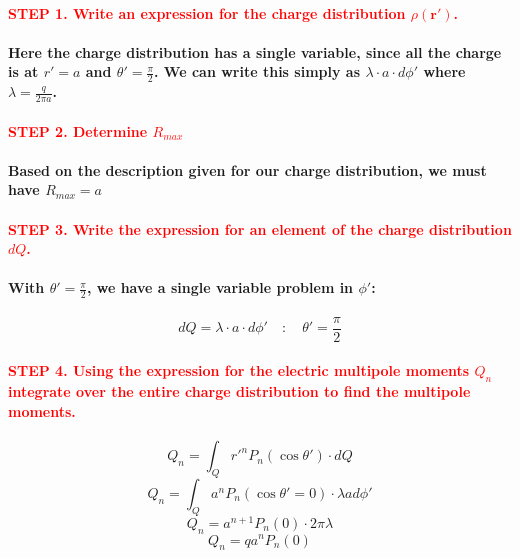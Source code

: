 \documentclass{article}
\begin{document}
\paragraph{\textcolor{red}{STEP 1. Write an expression for the charge distribution $\rho(\boldsymbol{r}')$.}}
\paragraph{\indent Here the charge distribution has a single variable, since all the charge is at $r'=a$ and $\theta'=\frac{\pi}{2}$. We can write this simply as $\lambda\cdot a\cdot d\phi'$ where $\lambda=\frac{q}{2\pi a}$.}
\paragraph{\textcolor{red}{STEP 2. Determine $R_{max}$}}
\paragraph{\indent Based on the description given for our charge distribution, we must have $R_{max}=a$}
\paragraph{\textcolor{red}{STEP 3. Write the expression for an element of the charge distribution $dQ$.}}
\paragraph{\indent With $\theta'=\frac{\pi}{2}$, we have a single variable problem in $\phi'$:}
\begin{equation*}
    dQ=\lambda\cdot a \cdot d\phi' \quad:\quad \theta'=\frac{\pi}{2}
\end{equation*}
\paragraph{\textcolor{red}{STEP 4. Using the expression for the electric multipole moments $Q_n$ integrate over the entire charge distribution to find the multipole moments.}}
\begin{equation*}
    Q_n=\int_Q r'^n P_n(\cos\theta')\cdot dQ
\end{equation*}
\begin{equation*}
    Q_n=\int_Q a^nP_n(\cos\theta'=0)\cdot\lambda a d\phi'
\end{equation*}
\begin{equation*}
    Q_n=a^{n+1}P_n(0)\cdot2\pi\lambda
\end{equation*}
\begin{equation*}
    Q_n=qa^nP_n(0)
\end{equation*}
\end{document}
